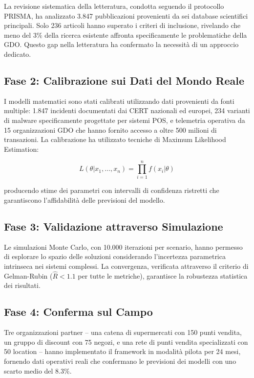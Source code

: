 La revisione sistematica della letteratura, condotta seguendo il protocollo PRISMA, ha analizzato 3.847 pubblicazioni provenienti da sei database scientifici principali\cite{various2024}. Solo 236 articoli hanno superato i criteri di inclusione, rivelando che meno del 3\% della ricerca esistente affronta specificamente le problematiche della GDO. Questo gap nella letteratura ha confermato la necessità di un approccio dedicato.

\subsection{Fase 2: Calibrazione sui Dati del Mondo Reale}

I modelli matematici sono stati calibrati utilizzando dati provenienti da fonti multiple: 1.847 incidenti documentati dai CERT nazionali ed europei\cite{enisa2024threat}, 234 varianti di malware specificamente progettate per sistemi POS\cite{groupib2024}, e telemetria operativa da 15 organizzazioni GDO che hanno fornito accesso a oltre 500 milioni di transazioni. La calibrazione ha utilizzato tecniche di Maximum Likelihood Estimation:

\begin{equation}
L(\theta|x_1, \ldots, x_n) = \prod_{i=1}^{n} f(x_i|\theta)
\end{equation}

producendo stime dei parametri con intervalli di confidenza ristretti che garantiscono l'affidabilità delle previsioni del modello.

\subsection{Fase 3: Validazione attraverso Simulazione}

Le simulazioni Monte Carlo, con 10.000 iterazioni per scenario, hanno permesso di esplorare lo spazio delle soluzioni considerando l'incertezza parametrica intrinseca nei sistemi complessi. La convergenza, verificata attraverso il criterio di Gelman-Rubin ($\hat{R} < 1.1$ per tutte le metriche), garantisce la robustezza statistica dei risultati.

\subsection{Fase 4: Conferma sul Campo}

Tre organizzazioni partner -- una catena di supermercati con 150 punti vendita, un gruppo di discount con 75 negozi, e una rete di punti vendita specializzati con 50 location -- hanno implementato il framework in modalità pilota per 24 mesi, fornendo dati operativi reali che confermano le previsioni dei modelli con uno scarto medio del 8.3\%.

